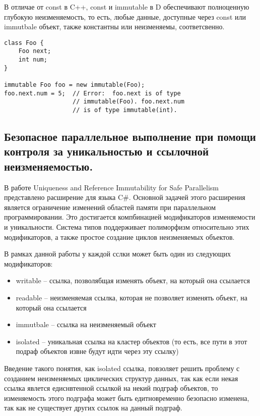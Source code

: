 В отличае от const в C++, const и immutable в D обеспечивают полноценную глубокую неизменяемость, то есть, любые данные, доступные через const или immutbale объект, также константны или неизменяемы, соответсвенно.

\begin{lstlisting}[caption=const vs immutable, label=code:d_const_vs_immutable]
class Foo {
    Foo next;
    int num;
}
 
immutable Foo foo = new immutable(Foo);
foo.next.num = 5;  // Error:  foo.next is of type 
                   // immutable(Foo). foo.next.num 
                   // is of type immutable(int).
\end{lstlisting}

\subsection{Безопасное параллельное выполнение при помощи контроля за уникальностью и ссылочной неизменяемостью.}

В работе Uniqueness and Reference Immutability for Safe Parallelism \cite{Gordon2012} представлено расширение для языка C\#. Основной задачей этого расширения является ограничение изменений областей памяти при параллельном программировании. Это достигается компбинацией модификаторов изменяемости и уникальности. Система типов поддерживает полиморфизм относительно этих модификаторов, а также простое создание циклов неизменяемых объектов.

В рамках данной работы у каждой сслки может быть один из следующих модификаторов:
\begin{itemize}
\item writable -- ссылка, позволябщая изменять объект, на который она ссылается
\item readable -- неизменяемая ссылка, которая не позволяет изменять объект, на который она ссылается
\item immutbale -- ссылка на неизменяемый объект
\item isolated -- уникальная ссылка на кластер объектов (то есть, все пути в этот подраф объектов извне будут идти через эту ссылку)
\end{itemize}

Введение такого понятия, как isolated ссылка, повзоляет решить проблему с созданием неизменяемых циклических структур данных, так как если некая ссылка явлется едиснвтенной ссылкой на некий подграф объектов, то изменяемость этого подграфа может быть едитновременно безопасно изменена, так как не существует других ссылок на данный подграф. 

